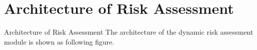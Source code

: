 \section{Architecture of Risk Assessment}
\begin{frame}{Architecture of Risk Assessment}
    The architecture of the dynamic risk assessment module is shown as following figure.\vspace{-10pt}
    \begin{figure}
      \centering
      \resizebox{\textwidth}{!}{}
    \end{figure}    
\end{frame} 